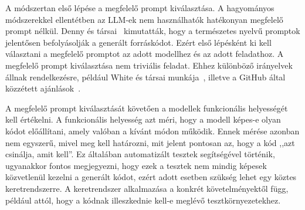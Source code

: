 \documentclass[12pt,a4paper]{extarticle}
\begin{document}
A módszertan első lépése a megfelelő prompt kiválasztása.
A hagyományos mód\-sze\-rek\-kel ellentétben az LLM-ek nem használhatók hatékonyan megfelelő prompt nélkül.
Denny és társai~\cite{codex_prompting} kimutatták, hogy a természetes nyelvű promptok jelentősen befolyásolják a generált forráskódot.
Ezért első lépésként ki kell választani a megfelelő promptot az adott modellhez és az adott feladathoz.
A megfelelő prompt kiválasztása nem triviális feladat.
Ehhez különböző irányelvek állnak rendelkezésre, például White és társai munkája~\cite{chatgpt_prompt_design}, illetve a GitHub által közzétett ajánlások~\cite{github_prompt_engineering}.


A megfelelő prompt kiválasztását követően a modellek funkcionális helyességét kell értékelni.
A funkcionális helyesség azt méri, hogy a modell képes-e olyan kódot előállítani, amely valóban a kívánt módon működik.
Ennek mérése azonban nem egyszerű, mivel meg kell határozni, mit jelent pontosan az, hogy a kód ,,azt csinálja, amit kell''.
Ez általában automatizált tesztek segítségével történik, ugyanakkor fontos megjegyezni, hogy ezek a tesztek nem mindig képesek közvetlenül kezelni a generált kódot, ezért adott esetben szükség lehet egy köztes keretrendszerre.
A keretrendszer alkalmazása a konkrét követelményektől függ, például attól, hogy a kódnak illeszkednie kell-e meglévő teszt\-kör\-nye\-ze\-tek\-hez.
\end{document}
